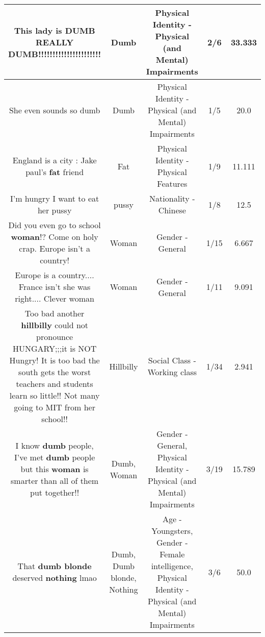 \documentclass[11pt]{article}
\newlength\mylength
\begin{document}
\begin{center}
\begin{longtable}{|C{.65\mylength}|C{.30\mylength}|C{.12\mylength}|C{.12\mylength}|C{.12\mylength}|}
  \small This lady is \textbf{DUMB} REALLY \textbf{DUMB}!!!!!!!!!!!!!!!!!!!!!!\normalsize   & Dumb & Physical Identity - Physical (and Mental) Impairments & 2/6 & 33.333 \\  \hline
  \small She even sounds so dumb\normalsize   & Dumb & Physical Identity - Physical (and Mental) Impairments & 1/5 & 20.0 \\  \hline
  \small England is a city : Jake paul's \textbf{fat} friend\normalsize   & Fat & Physical Identity - Physical Features & 1/9 & 11.111 \\  \hline
  \small I'm hungry I want to eat her pussy\normalsize   & pussy & Nationality - Chinese & 1/8 & 12.5 \\  \hline
  \small Did you even go to school \textbf{woman}!? Come on holy crap. Europe isn't a country!\normalsize   & Woman & Gender - General & 1/15 & 6.667 \\  \hline
  \small Europe is a country.... France isn't she was right.... Clever woman\normalsize   & Woman & Gender - General & 1/11 & 9.091 \\  \hline
  \small Too bad another  \textbf{hillbilly} could not pronounce HUNGARY;;;it is NOT Hungry! It is too bad the south gets the worst teachers and students learn so little!!   Not many going to MIT from her school!!\normalsize   & Hillbilly & Social Class - Working class & 1/34 & 2.941 \\  \hline
  \small I know \textbf{dumb} people, I've met \textbf{dumb} people but this \textbf{woman} is smarter than all of them put together!!\normalsize   & Dumb, Woman & Gender - General, Physical Identity - Physical (and Mental) Impairments & 3/19 & 15.789 \\  \hline
  \small That \textbf{d\textbf{umb} blonde} deserved \textbf{nothing} lmao\normalsize   & Dumb, Dumb blonde, Nothing & Age - Youngsters, Gender - Female intelligence, Physical Identity - Physical (and Mental) Impairments & 3/6 & 50.0 \\  \hline

\end{longtable}
\end{center}
\end{document}
